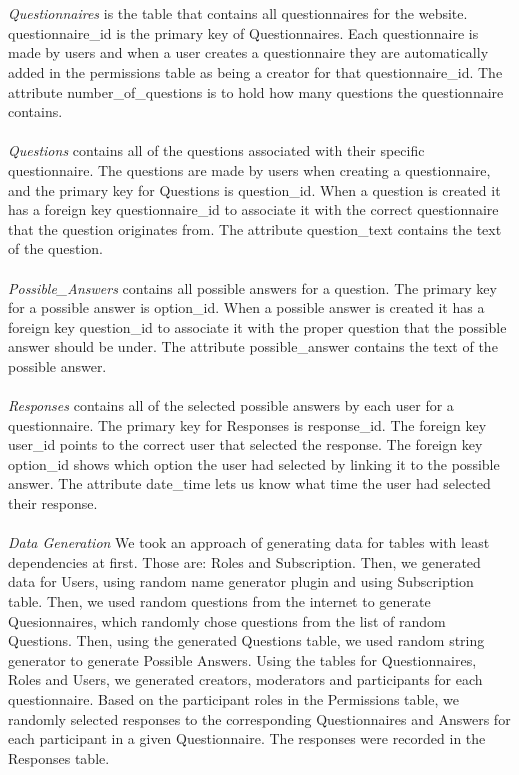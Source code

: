 \documentclass[12pt, oneside]{article}
\begin{document}
    \\
    \\
    \emph{Questionnaires} is the table that contains all questionnaires for the website. questionnaire\_id is the primary key of Questionnaires. Each questionnaire is made by users and when a user creates a questionnaire they are automatically added in the permissions table as being a creator for that questionnaire\_id.  The attribute number\_of\_questions is to hold how many questions the questionnaire contains.
    \\
    \\
    \emph{Questions} contains all of the questions associated with their specific questionnaire. The questions are made by users when creating a questionnaire, and the primary key for Questions is question\_id. When a question is created it has a foreign key questionnaire\_id to associate it with the correct questionnaire that the question originates from. The attribute question\_text contains the text of the question.
    \\
    \\
    \emph{Possible\_Answers} contains all possible answers for a question. The primary key for a possible answer is option\_id. When a possible answer is created it has a foreign key question\_id to associate it with the proper question that the possible answer should be under. The attribute possible\_answer contains the text of the possible answer.
    \\
    \\
    \emph{Responses} contains all of the selected possible answers by each user for a questionnaire. The primary key for Responses is response\_id. The foreign key user\_id points to the correct user that selected the response. The foreign key option\_id shows which option the user had selected by linking it to the possible answer. The attribute date\_time lets us know what time the user had selected their response.
    \\
    \\
    \emph{Data Generation}
    We took an approach of generating data for tables with least dependencies at first. Those are: Roles and Subscription. Then, we generated data for Users, using random name generator plugin and using Subscription table. Then, we used random questions from the internet to generate Quesionnaires, which randomly chose questions from the list of random Questions. Then, using the generated Questions table, we used random string generator to generate Possible Answers. Using the tables for Questionnaires, Roles and Users, we generated creators, moderators and participants for each questionnaire. Based on the participant roles in the Permissions table, we randomly selected responses to the corresponding Questionnaires and Answers for each participant in a given Questionnaire. The responses were recorded in the Responses table. 
\end{document}

